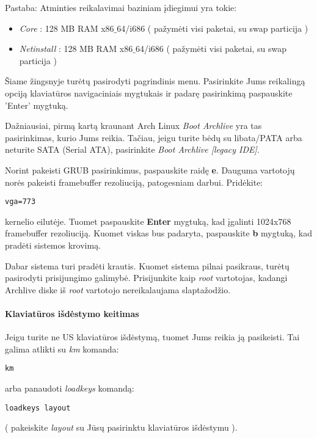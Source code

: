   Pastaba: Atminties reikalavimai baziniam įdiegimui yra tokie:
  \begin{itemize}
    \item \textsl{Core} : 128 MB RAM x86$\_$64/i686 ( pažymėti visi
      paketai, su swap particija )
    \item \textsl{Netinstall} : 128 MB RAM x86$\_$64/i686 ( pažymėti
      visi paketai, su swap particija )
  \end{itemize}

  Šiame žingsnyje turėtų pasirodyti pagrindinis menu. Pasirinkite
  Jums reikalingą opciją klaviatūros navigaciniais mygtukais ir padarę
  pasirinkimą paspauskite 'Enter' mygtuką.

  Dažniausiai, pirmą kartą kraunant Arch Linux \textsl{Boot Archlive}
  yra tas pasirinkimas, kurio Jums reikia. Tačiau, jeigu turite bėdų
  su libata/PATA arba neturite SATA (Serial ATA), pasirinkite
  \textsl{Boot Archlive [legacy IDE]}.

  Norint pakeisti GRUB pasirinkimus, paspauskite raidę
  \textbf{e}. Dauguma vartotojų norės pakeisti framebuffer
  rezoliuciją, patogesniam darbui. Pridėkite:
  \begin{verbatim}
vga=773
  \end{verbatim}
  kernelio eilutėje. Tuomet paspauskite \textbf{Enter} mygtuką, kad
  įgalinti 1024x768 framebuffer rezoliuciją. Kuomet viskas bus
  padaryta, paspauskite \textbf{b} mygtuką, kad pradėti sistemos
  krovimą.

  Dabar sistema turi pradėti krautis. Kuomet sistema pilnai pasikraus,
  turėtų pasirodyti prisijungimo galimybė. Prisijunkite kaip
  \textsl{root} vartotojas, kadangi Archlive diske iš \textsl{root}
  vartotojo nereikalaujama slaptažodžio.

  \paragraph{Klaviatūros išdėstymo keitimas}

  Jeigu turite ne US klaviatūros išdėstymą, tuomet Jums reikia ją
  pasikeisti. Tai galima atlikti su \textsl{km} komanda:
  \begin{verbatim}
km
  \end{verbatim}
  arba panaudoti \textsl{loadkeys} komandą:
  \begin{verbatim}
loadkeys layout
  \end{verbatim}
  ( pakeiskite \textsl{layout} su Jūsų pasirinktu klaviatūros
  išdėstymu ).

